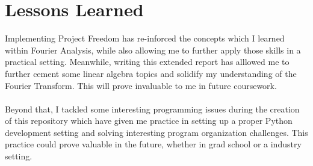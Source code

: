 \documentclass[notitlepage]{article}
\begin{document}
\section{Lessons Learned}

Implementing Project Freedom has re-inforced the concepts which I learned within Fourier Analysis,
while also allowing me to further apply those skills in a practical setting. Meanwhile, writing
this extended report has alllowed me to further cement some linear algebra topics and solidify
my understanding of the Fourier Transform. This will prove invaluable to me in future coursework.
\\\\
Beyond that, I tackled some interesting programming issues during the creation of this repository
which have given me practice in setting up a proper Python development setting and solving interesting
program organization challenges. This practice could prove valuable in the future, whether in grad
school or a industry setting.
\end{document}

